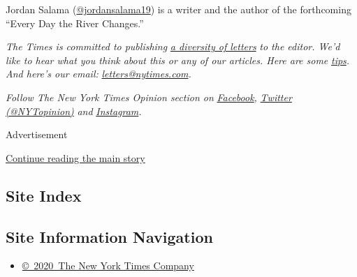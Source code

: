 Jordan Salama
(\href{https://twitter.com/JordanSalama19}{@jordansalama19}) is a writer
and the author of the forthcoming ``Every Day the River Changes.''

\emph{The Times is committed to publishing}
\href{https://www.nytimes.com/2019/01/31/opinion/letters/letters-to-editor-new-york-times-women.html}{\emph{a
diversity of letters}} \emph{to the editor. We'd like to hear what you
think about this or any of our articles. Here are some}
\href{https://help.nytimes.com/hc/en-us/articles/115014925288-How-to-submit-a-letter-to-the-editor}{\emph{tips}}\emph{.
And here's our email:}
\href{mailto:letters@nytimes.com}{\emph{letters@nytimes.com}}\emph{.}

\emph{Follow The New York Times Opinion section on}
\href{https://www.facebook.com/nytopinion}{\emph{Facebook}}\emph{,}
\href{http://twitter.com/NYTOpinion}{\emph{Twitter (@NYTopinion)}}
\emph{and}
\href{https://www.instagram.com/nytopinion/}{\emph{Instagram}}\emph{.}

Advertisement

\protect\hyperlink{after-bottom}{Continue reading the main story}

\hypertarget{site-index}{%
\subsection{Site Index}\label{site-index}}

\hypertarget{site-information-navigation}{%
\subsection{Site Information
Navigation}\label{site-information-navigation}}

\begin{itemize}
\tightlist
\item
  \href{https://help.nytimes.com/hc/en-us/articles/115014792127-Copyright-notice}{©~2020~The
  New York Times Company}
\end{itemize}

